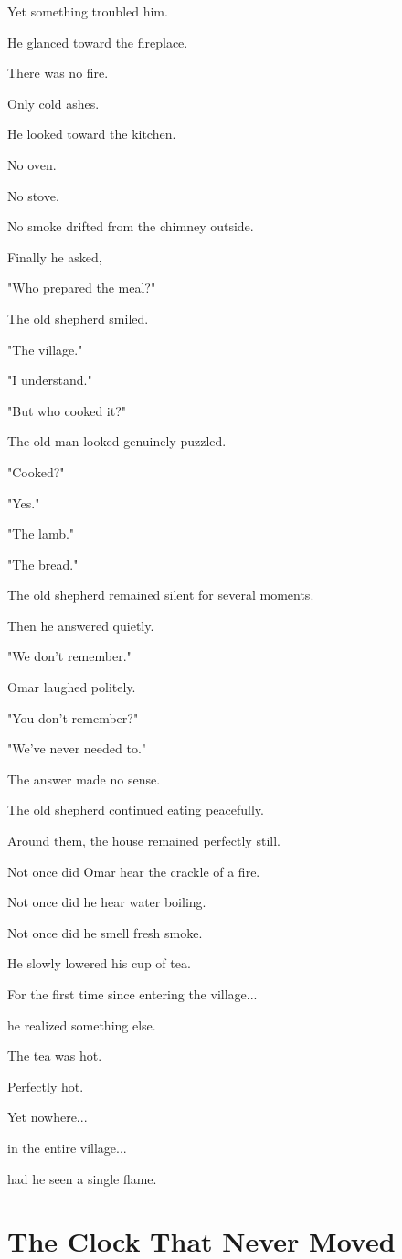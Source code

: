 \documentclass[12pt,openany]{book}
\begin{document}
Yet something troubled him.

He glanced toward the fireplace.

There was no fire.

Only cold ashes.

He looked toward the kitchen.

No oven.

No stove.

No smoke drifted from the chimney outside.

Finally he asked,

"Who prepared the meal?"

The old shepherd smiled.

"The village."

"I understand."

"But who cooked it?"

The old man looked genuinely puzzled.

"Cooked?"

"Yes."

"The lamb."

"The bread."

The old shepherd remained silent for several moments.

Then he answered quietly.

"We don't remember."

Omar laughed politely.

"You don't remember?"

"We've never needed to."

The answer made no sense.

The old shepherd continued eating peacefully.

Around them, the house remained perfectly still.

Not once did Omar hear the crackle of a fire.

Not once did he hear water boiling.

Not once did he smell fresh smoke.

He slowly lowered his cup of tea.

For the first time since entering the village...

he realized something else.

The tea was hot.

Perfectly hot.

Yet nowhere...

in the entire village...

had he seen a single flame.
\section*{The Clock That Never Moved}
\end{document}
